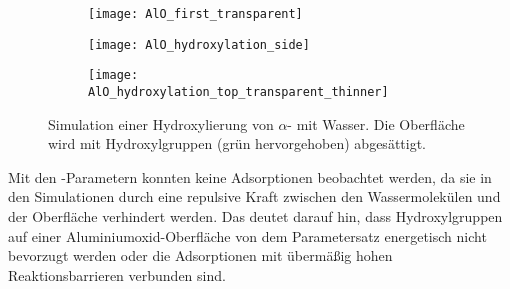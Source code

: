 \begin{figure}[tb]
  \centering
  \captionsetup[subfigure]{singlelinecheck=false}

  \begin{subfigure}[c]{7.5cm}
    \begin{framed}
      \hspace{0.5em}
      \hspace{0.5em}
      \hspace{0.5em}
    \end{framed}
  \end{subfigure}

  \vspace{1em}

  \def\subfigwidth{0.32\textwidth}
  \begin{subfigure}[t]{\subfigwidth}
    \texttt{[image: AlO\_first\_transparent]}
    \label{fig:wateraluminasurface-a}
  \end{subfigure}
  \hfill
  \begin{subfigure}[t]{\subfigwidth}
    \texttt{[image: AlO\_hydroxylation\_side]}
    \label{fig:wateraluminasurface-b}
  \end{subfigure}
  \hfill
  \begin{subfigure}[t]{\subfigwidth}
    \texttt{[image: AlO\_hydroxylation\_top\_transparent\_thinner]}
    \label{fig:wateraluminasurface-c}
  \end{subfigure}
  \caption[Simulation einer $alpha$--Hydroxylierung mit ]{
    Simulation einer Hydroxylierung von $\alpha$- mit Wasser.
    Die Oberfläche wird mit Hydroxylgruppen (grün hervorgehoben) abgesättigt.
  }
  \label{fig:wateraluminasurface}
\end{figure}

Mit den -Parametern konnten keine Adsorptionen beobachtet werden, da sie in den Simulationen durch eine repulsive Kraft zwischen den Wassermolekülen und der Oberfläche verhindert werden.
Das deutet darauf hin, dass Hydroxylgruppen auf einer Aluminiumoxid-Oberfläche von dem Parametersatz energetisch nicht bevorzugt werden oder die Adsorptionen mit übermäßig hohen Reaktionsbarrieren verbunden sind.

